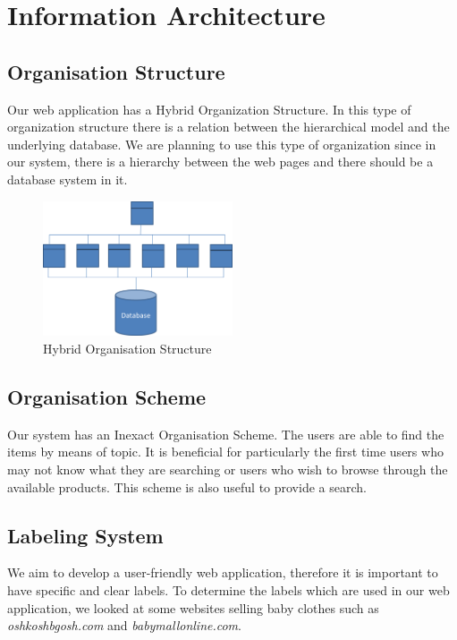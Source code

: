 \section{Information Architecture}

\subsection{Organisation Structure}
Our web application has a Hybrid Organization Structure. In this type of organization structure there is a relation between the hierarchical model and the underlying database. We are planning to use this type of organization since in our system, there is a hierarchy between the web pages and there should be a database system in it.

\begin{figure}[ht!]
  \centering  
  \includegraphics[width=0.5\textwidth]{Images/hybrid_org.png}                
  \caption{Hybrid Organisation Structure}
  \label{fig:hybrid_org}
\end{figure}


\subsection{Organisation Scheme}
Our system has an Inexact Organisation Scheme. The users are able to find the items by means of topic. It is beneficial for particularly the first time users who may not know what they are searching or users who wish to browse through the available products. This scheme is also useful to provide a search.

\subsection{Labeling System}\label{sec:labeling_system}
We aim to develop a user-friendly web application, therefore it is important to have specific and clear labels. To determine the labels which are used in our web application, we looked at some websites selling baby clothes such as \textit{oshkoshbgosh.com} and \textit{babymallonline.com}.

